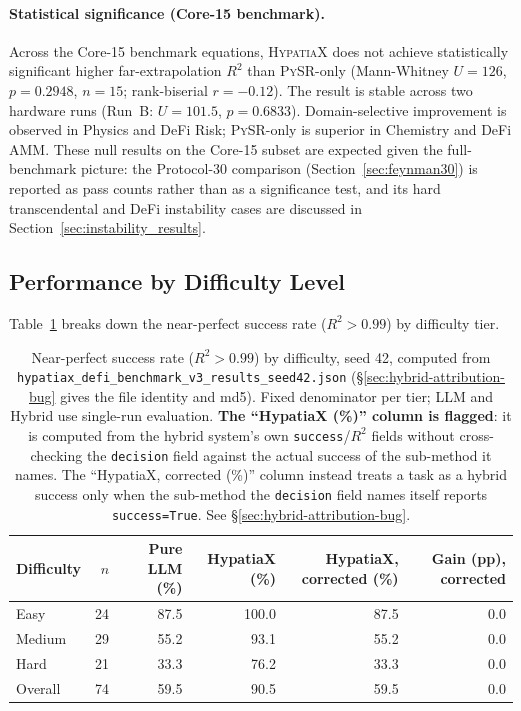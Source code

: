 \documentclass[twoside,11pt]{article}
\newcommand{\Rsq}{R^{2}}
\begin{document}
\paragraph{Statistical significance (Core-15 benchmark).}
Across the Core-15 benchmark equations, \textsc{HypatiaX} does not achieve
statistically significant higher far-extrapolation $\Rsq$ than \textsc{PySR}-only
(Mann-Whitney $U=126$, $p=0.2948$, $n=15$; rank-biserial $r=-0.12$).  The result
is stable across two hardware runs (Run~B: $U=101.5$, $p=0.6833$).
Domain-selective improvement is observed in Physics and DeFi Risk;
\textsc{PySR}-only is superior in Chemistry and DeFi AMM.
These null results on the Core-15 subset are expected given the full-benchmark
picture: the Protocol-30 comparison (Section~\ref{sec:feynman30}) is reported as pass counts
rather than as a significance test, and its hard transcendental and DeFi
instability cases are discussed in Section~\ref{sec:instability_results}.

\subsection{Performance by Difficulty Level}\label{subsec:performance-by-difficulty-level}
\label{sec:difficulty}

Table~\ref{tab:difficulty} breaks down the near-perfect success rate ($\Rsq > 0.99$)
by difficulty tier.

\begin{table}[h]
\centering
\caption{Near-perfect success rate ($\Rsq > 0.99$) by difficulty, seed 42,
computed from \texttt{hypatiax\_defi\_benchmark\_v3\_results\_seed42.json}
(\S\ref{sec:hybrid-attribution-bug} gives the file identity and md5).
Fixed denominator per tier; LLM and Hybrid use single-run evaluation.
\textbf{The ``HypatiaX (\%)'' column is flagged}: it is computed from the
hybrid system's own \texttt{success}/$\Rsq$ fields without cross-checking the
\texttt{decision} field against the actual success of the sub-method it
names. The ``HypatiaX, corrected (\%)'' column instead treats a task as a
hybrid success only when the sub-method the \texttt{decision} field names
itself reports \texttt{success=True}. See \S\ref{sec:hybrid-attribution-bug}.}
\label{tab:difficulty}
\begin{tabular}{lrrrrr}
\toprule
Difficulty & $n$ & Pure LLM (\%) & HypatiaX (\%) & HypatiaX, corrected (\%) & Gain (pp), corrected \\
\midrule
Easy       & 24  & 87.5          & 100.0 & 87.5 & $0.0$ \\
Medium     & 29  & 55.2          & 93.1  & 55.2 & $0.0$ \\
Hard       & 21  & 33.3          & 76.2  & 33.3 & $0.0$ \\
\midrule
Overall    & 74  & 59.5          & 90.5 & 59.5 & $0.0$ \\
\bottomrule
\end{tabular}
\end{table}
\end{document}
